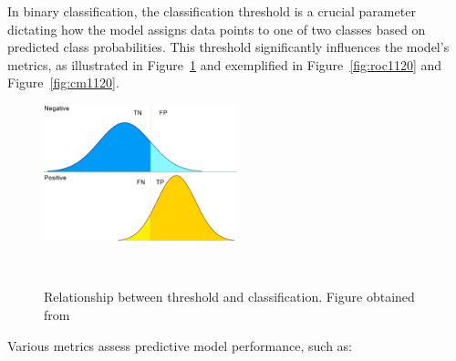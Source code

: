 In binary classification, the classification threshold is a crucial parameter dictating how the model assigns data points to one of two classes based on predicted class probabilities. This threshold significantly influences the model's metrics, as illustrated in Figure~\ref{fig:classification_threshold} and exemplified in Figure~\ref{fig:roc1120} and Figure~\ref{fig:cm1120}.
\begin{figure} 
  \centering
  \includegraphics[width=0.5\textwidth]{figures/classification_threshold.png}
  \caption{Relationship between threshold and classification. Figure obtained from~\cite{wicklin2020}}
~\label{fig:classification_threshold}
\end{figure}

Various metrics assess predictive model performance, such as:

